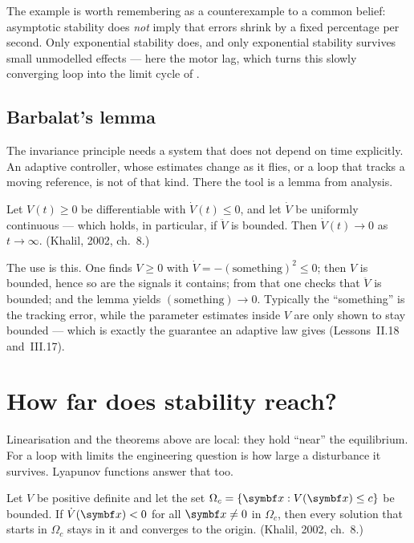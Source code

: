 The example is worth remembering as a counterexample to a common belief: asymptotic stability does \emph{not} imply that errors shrink by a fixed percentage per second. Only exponential stability does, and only exponential stability survives small unmodelled effects — here the motor lag, which turns this slowly converging loop into the limit cycle of .

\subsection{Barbalat's lemma}
The invariance principle needs a system that does not depend on time explicitly. An adaptive controller, whose estimates change as it flies, or a loop that tracks a moving reference, is not of that kind. There the tool is a lemma from analysis.

\begin{theorem}
\label{thm:G-barbalat}
Let $V(t) \ge 0$ be differentiable with $\dot V(t) \le 0$, and let $\dot V$ be uniformly continuous — which holds, in particular, if $\ddot V$ is bounded. Then $\dot V(t) \to 0$ as $t \to \infty$. (Khalil, 2002, ch.~8.)
\end{theorem}

The use is this. One finds $V \ge 0$ with $\dot V = -(\text{something})^2 \le 0$; then $V$ is bounded, hence so are the signals it contains; from that one checks that $\ddot V$ is bounded; and the lemma yields $(\text{something}) \to 0$. Typically the \enquote{something} is the tracking error, while the parameter estimates inside $V$ are only shown to stay bounded — which is exactly the guarantee an adaptive law gives (Lessons~II.18 and~III.17).

\section{How far does stability reach?}

Linearisation and the theorems above are local: they hold \enquote{near} the equilibrium. For a loop with limits the engineering question is how large a disturbance it survives. Lyapunov functions answer that too.

\begin{theorem}
\label{thm:G-roa}
Let $V$ be positive definite and let the set $\Omega_c = \{\vx : V(\vx) \le c\}$ be bounded. If $\dot V(\vx) < 0$ for all $\vx \ne 0$ in $\Omega_c$, then every solution that starts in $\Omega_c$ stays in it and converges to the origin. (Khalil, 2002, ch.~8.)
\end{theorem}

